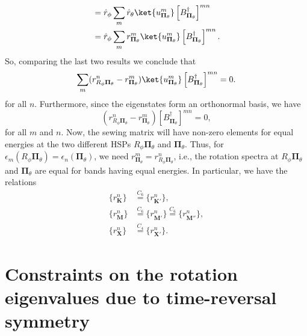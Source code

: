 {\begin{equation}
\begin{aligned}
&= \hat{r}_\phi \sum_m \hat{r}_{\theta} \ket{u_{{\mathbf \Pi}_{\theta}}^m}\left[B_{{\mathbf \Pi}_{\theta}}^{\dagger}\right]^{mn}  \\
&= \hat{r}_\phi \sum_m r_{{\mathbf \Pi}_{\theta}}^m \ket{u_{{\mathbf \Pi}_{\theta}}^m}\left[B_{{\mathbf \Pi}_{\theta}}^{\dagger}\right]^{mn}.
\end{aligned}
\end{equation}
So, comparing the last two results we conclude that
\begin{equation}
\sum_m (r_{R_\phi {\mathbf \Pi}_{\theta}}^n-r_{{\mathbf \Pi}_{\theta}}^m) \ket{u_{{\mathbf \Pi}_{\theta}}^m}\left[B_{{\mathbf \Pi}_{\theta}}^{\dagger}\right]^{mn}=0.
\end{equation}
for all $n$. Furthermore, since the eigenstates form an orthonormal basis, we have
\begin{equation}
(r_{R_\phi {\mathbf \Pi}_{\theta}}^n-r_{{\mathbf \Pi}_{\theta}}^m) \left[B_{{\mathbf \Pi}_{\theta}}^{\dagger}\right]^{mn}=0,
\end{equation}
for all $m$ and $n$. Now, the sewing matrix will have non-zero elements for equal energies at the two different HSPs $R_\phi {\mathbf \Pi}_{\theta}$ and ${\mathbf \Pi}_{\theta}$. Thus, for $\epsilon_m(R_\phi {\mathbf \Pi}_{\theta})=\epsilon_n({\mathbf \Pi}_{\theta})$, we need $r^m_{{\mathbf \Pi}_{\theta}}=r^n_{R_\phi {\mathbf \Pi}_{\theta}}$, i.e., the rotation spectra at $R_\phi {\mathbf \Pi}_{\theta}$ and ${\mathbf \Pi}_{\theta}$ are equal for bands having equal energies.
In particular, we have the relations
\begin{equation}
\begin{aligned}
\{r^n_{\mathbf{K}}\}&\stackrel{C_6}{=}\{r^n_{\mathbf{K'}}\}, \\ 
\{r^n_{\mathbf{M}}\}& \stackrel{C_6}{=} \{r^n_{\mathbf{M'}}\} \stackrel{C_6}{=} \{r^n_{\mathbf{M''}}\}, \\
\{r^n_{\mathbf{X}}\}& \stackrel{C_4}{=} \{r^n_{\mathbf{X'}}\}.
\end{aligned}
\end{equation}

\section[Constraints on the rotation eigenvalues due to TRS]{Constraints on the rotation eigenvalues due to time-reversal symmetry}
\label{sec:trscnstrnswladimir}

}
